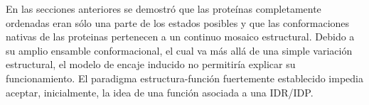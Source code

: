 







En las secciones anteriores se demostró que las proteínas completamente ordenadas eran sólo una parte de los estados posibles y que las conformaciones nativas de las proteinas pertenecen a un continuo mosaico estructural.
Debido a su amplio ensamble conformacional, el cual va más allá de una simple variación estructural, el modelo de encaje inducido no permitiría explicar su funcionamiento.
El paradigma estructura-función fuertemente establecido impedia aceptar, inicialmente, la idea de una función asociada a una IDR/IDP. 

